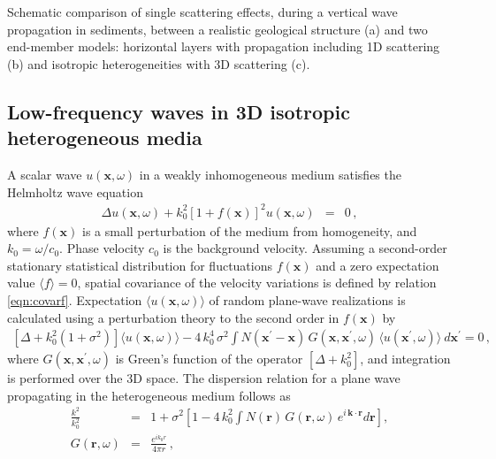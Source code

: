 {Schematic comparison of single scattering effects,
during a vertical wave propagation in sediments,
between a realistic geological structure (a) and two end-member models:
horizontal layers with propagation including 1D scattering (b)
and isotropic heterogeneities with 3D scattering (c).}

\subsection{Low-frequency waves in 3D isotropic heterogeneous media}


A scalar wave $u(\mathbf{x},\omega)$ in a weakly inhomogeneous medium 
\cite[]{Chernov_60,Tatarski_61,Karal_K64}
satisfies the Helmholtz wave equation\,
\begin{eqnarray}
\Delta u(\mathbf{x},\omega) + k_0^2\left[1+f(\mathbf{x})\right]^2u(\mathbf{x},\omega) & = & 0\,, \label{eqn:helmh}
\end{eqnarray}
where $f(\mathbf{x})$ is a small perturbation of the medium from homogeneity, and $k_0=\omega/c_0$.
Phase velocity $c_0$ is the background velocity.
Assuming a second-order stationary statistical distribution 
for fluctuations $f(\mathbf{x})$ and a zero expectation value $\langle f \rangle = 0$, spatial covariance of the velocity variations is
defined by relation \ref{eqn:covarf}.
Expectation $\langle u(\mathbf{x},\omega)\rangle$ of random plane-wave realizations
is calculated \cite[]{Karal_K64} 
using a perturbation theory to the second order in $f(\mathbf{x})$ by
\begin{eqnarray}
\left[\Delta+k_0^2(1+\sigma^2)\right]\langle u(\mathbf{x},\omega)\rangle -
4\,k_0^4\,\sigma^2\int N(\mathbf{x}^{\prime}-\mathbf{x})\,G(\mathbf{x},\mathbf{x}^{\prime},\omega)
\,\langle u(\mathbf{x}^{\prime},\omega)\rangle~d\mathbf{x}^{\prime}= 0\,,
\end{eqnarray}
where $G(\mathbf{x},\mathbf{x}^{\prime},\omega)$ is Green's function of the operator $\left[\Delta+k_0^2\right]$,
and integration is performed over the 3D space.
The dispersion relation for a plane wave propagating in the heterogeneous medium follows as
\begin{eqnarray}
\frac{k^2}{k_0^2} & = & 1 + \sigma^2\left[1 - 4\,k_0^2
\int N(\mathbf{r})\,G(\mathbf{r},\omega)\,e^{i\,\mathbf{k}\cdot\mathbf{r}}d\mathbf{r}\right], \label{eqn:dispersg}\\
G(\mathbf{r},\omega) & = & \frac{e^{ik_0r}}{4\pi r}\,,\label{eqn:green3d}
\end{eqnarray}
